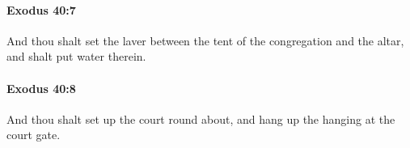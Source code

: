 		\paragraph{Exodus 40:7} %
			\label{EXODUS-40-7}

			And thou shalt set the laver between the tent of the congregation and the altar, and shalt put water therein.


		\paragraph{Exodus 40:8} %
			\label{EXODUS-40-8}

			And thou shalt set up the court round about, and hang up the hanging at the court gate.


